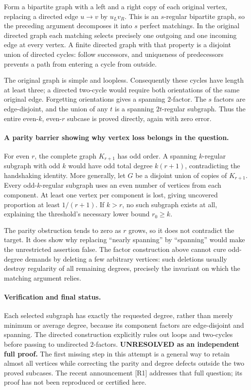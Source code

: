 \documentclass[11pt,a4paper]{article}
\begin{document}
Form a bipartite graph with a left and a right copy of each original
vertex, replacing a directed edge $u\to v$ by $u_Lv_R$. This is an
$s$-regular bipartite graph, so the preceding argument decomposes it
into $s$ perfect matchings. In the original directed graph each matching
selects precisely one outgoing and one incoming edge at every vertex.
A finite directed graph with that property is a disjoint union of
directed cycles: follow successors, and uniqueness of predecessors
prevents a path from entering a cycle from outside.

The original graph is simple and loopless. Consequently these cycles
have length at least three; a directed two-cycle would require both
orientations of the same original edge. Forgetting orientations gives
a spanning $2$-factor. The $s$ factors are edge-disjoint, and the union
of any $t$ is a spanning $2t$-regular subgraph. Thus the entire even-$k$,
even-$r$ subcase is proved directly, again with zero error.

\paragraph{A parity barrier showing why vertex loss belongs in the question.}
For even $r$, the complete graph $K_{r+1}$ has odd order. A spanning
$k$-regular subgraph with odd $k$ would have odd total degree
$k(r+1)$, contradicting the handshaking identity. More generally, let
$G$ be a disjoint union of copies of $K_{r+1}$. Every odd-$k$-regular
subgraph uses an even number of vertices from each component. At least
one vertex per component is lost, giving uncovered proportion at least
$1/(r+1)$. If $k>r$, no such subgraph exists at all, explaining the
threshold's necessary lower bound $r_0\ge k$.

The parity obstruction tends to zero as $r$ grows, so it does not
contradict the target. It does show why replacing ``nearly spanning''
by ``spanning'' would make the unrestricted assertion false. The factor
construction above cannot cure odd-degree demands by deleting a few
arbitrary vertices: such deletions usually destroy regularity of all
remaining degrees, precisely the invariant on which the matching
argument relies.

\paragraph{Verification and final status.}
Each selected subgraph has exactly the requested degree, rather than
merely minimum or average degree, because its component factors are
edge-disjoint and spanning. The directed construction explicitly rules
out loops and two-cycles before passing to undirected $2$-factors.
\textbf{UNRESOLVED as an independent full proof.} The first missing step
in this attempt is a general way to retain almost all vertices while
correcting the parity and degree defects outside the two proved
subcases. The recent announcement [R1] addresses that full question;
its proof has not been reproduced or certified here.
\end{document}

